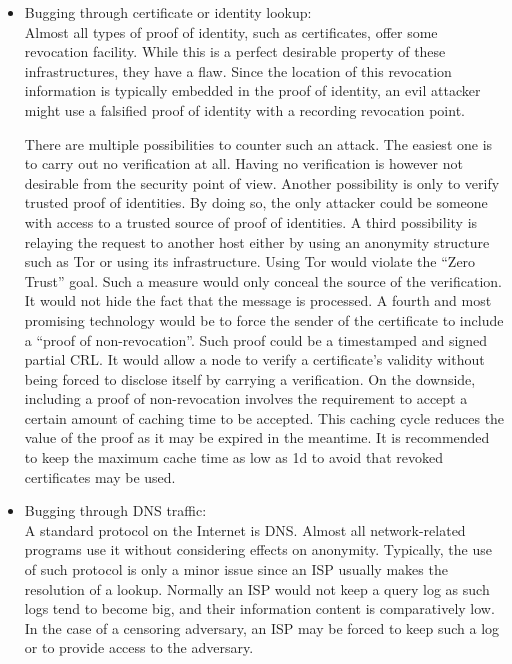 \begin{itemize}
	\item Bugging through certificate or identity lookup:\\
	Almost all types of proof of identity, such as certificates, offer some revocation facility. While this is a perfect desirable property of these infrastructures, they have a flaw. Since the location of this revocation information is typically embedded in the proof of identity, an evil attacker might use a falsified proof of identity with a recording revocation point.
	
	There are multiple possibilities to counter such an attack. The easiest one is to carry out no verification at all. Having no verification is however not desirable from the security point of view. Another possibility is only to verify trusted proof of identities. By doing so, the only attacker could be someone with access to a trusted source of proof of identities. A third possibility is relaying the request to another host either by using an anonymity structure such as Tor or using its infrastructure. Using Tor would violate the ``Zero Trust'' goal. Such a measure would only conceal the source of the verification. It would not hide the fact that the message is processed. A fourth and most promising technology would be to force the sender of the certificate to include a ``proof of non-revocation''. Such proof could be a timestamped and signed partial CRL. It would allow a node to verify a certificate's validity without being forced to disclose itself by carrying a verification. On the downside, including a proof of non-revocation involves the requirement to accept a certain amount of caching time to be accepted. This caching cycle reduces the value of the proof as it may be expired in the meantime. It is recommended to keep the maximum cache time as low as 1d to avoid that revoked certificates may be used. 
	
	\item Bugging through DNS traffic:\\
	A standard protocol on the Internet is DNS. Almost all network-related programs use it without considering effects on anonymity.  Typically, the use of such protocol is only a minor issue since an ISP usually makes the resolution of a lookup. Normally an ISP would not keep a query log as such logs tend to become big, and their information content is comparatively low. In the case of a censoring adversary, an ISP may be forced to keep such a log or to provide access to the adversary.
	

\end{itemize}
